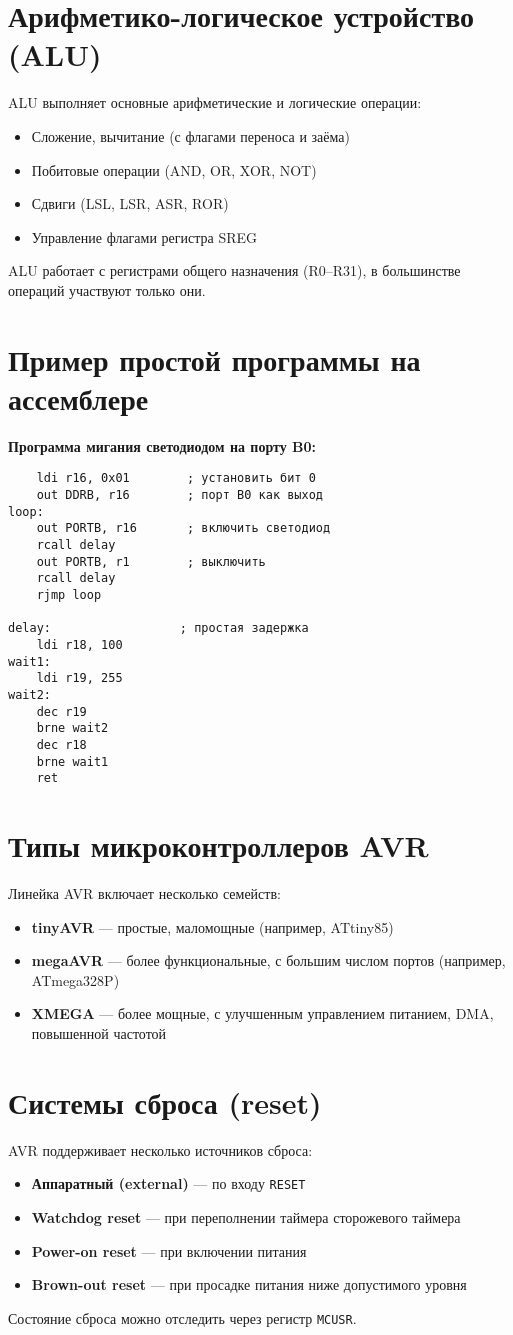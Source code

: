 \documentclass[a4paper,12pt]{article}
\begin{document}
\section{Арифметико-логическое устройство (ALU)}
ALU выполняет основные арифметические и логические операции:
\begin{itemize}
    \item Сложение, вычитание (с флагами переноса и заёма)
    \item Побитовые операции (AND, OR, XOR, NOT)
    \item Сдвиги (LSL, LSR, ASR, ROR)
    \item Управление флагами регистра SREG
\end{itemize}
ALU работает с регистрами общего назначения (R0–R31), в большинстве операций участвуют только они.

\section{Пример простой программы на ассемблере}
\textbf{Программа мигания светодиодом на порту B0:}
\begin{verbatim}
    ldi r16, 0x01        ; установить бит 0
    out DDRB, r16        ; порт B0 как выход
loop:
    out PORTB, r16       ; включить светодиод
    rcall delay
    out PORTB, r1        ; выключить
    rcall delay
    rjmp loop

delay:                  ; простая задержка
    ldi r18, 100
wait1:
    ldi r19, 255
wait2:
    dec r19
    brne wait2
    dec r18
    brne wait1
    ret
\end{verbatim}

\section{Типы микроконтроллеров AVR}
Линейка AVR включает несколько семейств:
\begin{itemize}
    \item \textbf{tinyAVR} — простые, маломощные (например, ATtiny85)
    \item \textbf{megaAVR} — более функциональные, с большим числом портов (например, ATmega328P)
    \item \textbf{XMEGA} — более мощные, с улучшенным управлением питанием, DMA, повышенной частотой
\end{itemize}

\section{Системы сброса (reset)}
AVR поддерживает несколько источников сброса:
\begin{itemize}
    \item \textbf{Аппаратный (external)} — по входу \texttt{RESET}
    \item \textbf{Watchdog reset} — при переполнении таймера сторожевого таймера
    \item \textbf{Power-on reset} — при включении питания
    \item \textbf{Brown-out reset} — при просадке питания ниже допустимого уровня
\end{itemize}
Состояние сброса можно отследить через регистр \texttt{MCUSR}.
\end{document}
